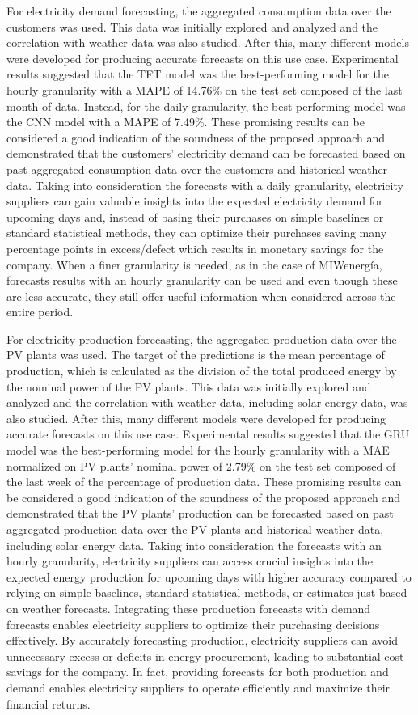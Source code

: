 For electricity demand forecasting, the aggregated consumption data over the customers was used.
This data was initially explored and analyzed and the correlation with weather data was also studied.
After this, many different models were developed for producing accurate forecasts on this use case.
Experimental results suggested that the TFT model was the best-performing model for the hourly granularity with a MAPE of 14.76\% on the test set composed of the last month of data.
Instead, for the daily granularity, the best-performing model was the CNN model with a MAPE of 7.49\%.
These promising results can be considered a good indication of the soundness of the proposed approach and demonstrated that the customers' electricity demand can be forecasted based on past aggregated consumption data over the customers and historical weather data.
Taking into consideration the forecasts with a daily granularity, electricity suppliers can gain valuable insights into the expected electricity demand for upcoming days and, instead of basing their purchases on simple baselines or standard statistical methods, they can optimize their purchases saving many percentage points in excess/defect which results in monetary savings for the company.
When a finer granularity is needed, as in the case of MIWenergía, forecasts results with an hourly granularity can be used and even though these are less accurate, they still offer useful information when considered across the entire period.

For electricity production forecasting, the aggregated production data over the PV plants was used.
The target of the predictions is the mean percentage of production, which is calculated as the division of the total produced energy by the nominal power of the PV plants.
This data was initially explored and analyzed and the correlation with weather data, including solar energy data, was also studied.
After this, many different models were developed for producing accurate forecasts on this use case.
Experimental results suggested that the GRU model was the best-performing model for the hourly granularity with a MAE normalized on PV plants' nominal power of 2.79\% on the test set composed of the last week of the percentage of production data.
These promising results can be considered a good indication of the soundness of the proposed approach and demonstrated that the PV plants' production can be forecasted based on past aggregated production data over the PV plants and historical weather data, including solar energy data.
Taking into consideration the forecasts with an hourly granularity, electricity suppliers can access crucial insights into the expected energy production for upcoming days with higher accuracy compared to relying on simple baselines, standard statistical methods, or estimates just based on weather forecasts.
Integrating these production forecasts with demand forecasts enables electricity suppliers to optimize their purchasing decisions effectively.
By accurately forecasting production, electricity suppliers can avoid unnecessary excess or deficits in energy procurement, leading to substantial cost savings for the company.
In fact, providing forecasts for both production and demand enables electricity suppliers to operate efficiently and maximize their financial returns.


